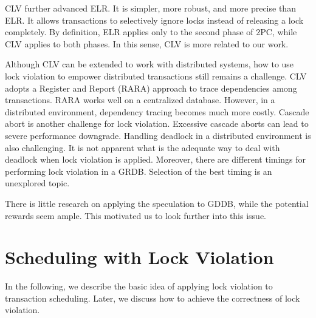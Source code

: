 \documentclass[conference]{IEEEtran}
\begin{document}
\begin{highlighted}

CLV further advanced ELR. 
It is simpler, more robust, and more precise than ELR.
It allows transactions to selectively ignore locks instead of releasing a lock completely.
By definition, ELR  applies only to the second phase of 2PC, while CLV applies to both phases.
In this sense, CLV is more related to our work.

Although CLV can be extended to work with distributed systems, 
how to use lock violation to empower distributed transactions still remains a challenge.
CLV adopts a Register and Report (RARA) approach \cite{HeckatonMVCC:journals/pvldb/LarsonBDFPZ11} to trace dependencies among transactions.
RARA works well on a centralized database. 
However, in a distributed environment, dependency tracing becomes much more costly.
Cascade abort is another challenge for lock violation. 
Excessive cascade aborts can lead to severe performance downgrade.
Handling deadlock in a distributed environment is also challenging. It is not apparent what is the adequate way to deal with deadlock when lock violation is applied.
Moreover, there are different timings for performing lock violation in a GRDB. Selection of the best timing is an unexplored topic.
 
\end{highlighted}

There is little research on applying the speculation to GDDB, while the potential rewards seem ample. This motivated us to look further into this issue.


\section{Scheduling with Lock Violation}
\label{sec:non_strict}

In the following, we describe the basic idea of applying lock violation to transaction scheduling.
Later, we discuss how to achieve the correctness of lock violation.
\end{document}
